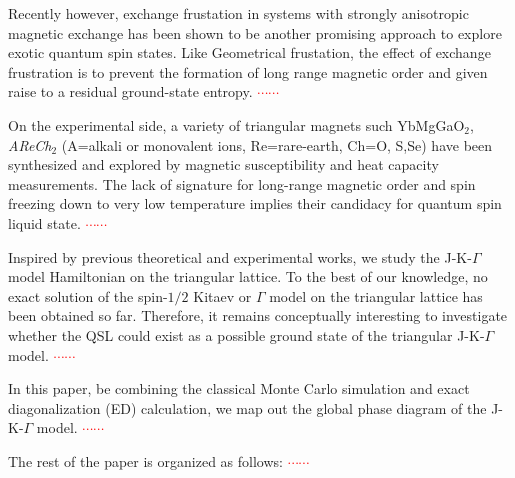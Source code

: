 \documentclass[aps,prb,reprint,groupedaddress,showpacs,amsfonts,amsmath,amssymb,superscriptaddress]{revtex4-1}
\begin{document}
Recently however, exchange frustation in systems with strongly anisotropic magnetic exchange has been shown to be another promising approach to explore exotic quantum spin states. Like Geometrical frustation, the effect of exchange frustration is to prevent the formation of long range magnetic order and given raise to a residual ground-state entropy. \textcolor{red}{$\cdots\cdots$}

On the experimental side, a variety of triangular magnets such YbMgGaO$_2$, \emph{AReCh}$_2$ (A=alkali or monovalent ions, Re=rare-earth, Ch=O, S,Se) have been synthesized and explored by magnetic susceptibility and heat capacity measurements. The lack of signature for long-range magnetic order and spin freezing down to very low temperature implies their candidacy for quantum spin liquid state. \textcolor{red}{$\cdots\cdots$}

Inspired by previous theoretical and experimental works, we study the J-K-$\Gamma$ model Hamiltonian on the triangular lattice. To the best of our knowledge, no exact solution of the spin-$1/2$ Kitaev or $\Gamma$ model on the triangular lattice has been obtained so far. Therefore, it remains conceptually interesting to investigate whether the QSL could exist as a possible ground state of the triangular J-K-$\Gamma$ model. \textcolor{red}{$\cdots\cdots$}

In this paper, be combining the classical Monte Carlo simulation and exact diagonalization (ED) calculation, we map out the global phase diagram of the J-K-$\Gamma$ model. \textcolor{red}{$\cdots\cdots$}

The rest of the paper is organized as follows: \textcolor{red}{$\cdots\cdots$}
\end{document}
